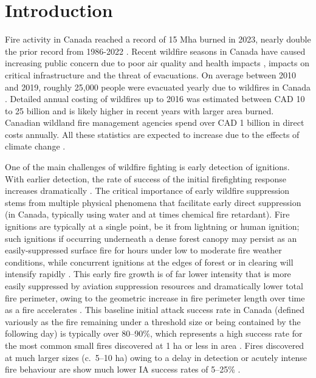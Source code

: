 \documentclass[fire,article,submit,moreauthors]{mdpi}
\begin{document}

\section{Introduction}\label{introduction}

Fire activity in Canada reached a record of 15 Mha burned in 2023,
nearly double the prior record from 1986-2022 \citep{hanes2025}. Recent
wildfire seasons in Canada have caused increasing public concern due to
poor air quality and health impacts
\citep{hertelendySeasonsSmokeFire2024, michaudLetterCanadaGlobal2024},
impacts on critical infrastructure and the threat of evacuations. On
average between 2010 and 2019, roughly 25,000 people were evacuated
yearly due to wildfires in Canada
\citep{christiansonWildlandFireEvacuations2024}. Detailed annual costing
of wildfires up to 2016 was estimated between CAD 10 to 25 billion
\citep{hopeWildfireSuppressionCosts2016} and is likely higher in recent
years with larger area burned. Canadian wildland fire management
agencies spend over CAD 1 billion in direct costs
annually\citep{stocksForestFireManagement2016, hopeWildfireSuppressionCosts2016}.
All these statistics are expected to increase due to the effects of
climate change
\citep{wangIncreasingFrequencyExtreme2015, hopeWildfireSuppressionCosts2016}.

One of the main challenges of wildfire fighting is early detection of
ignitions. With earlier detection, the rate of success of the initial
firefighting response increases dramatically
\citep{korkolaComparativeAnalysisWildfire2024, hirschReviewInitialAttack1996, hirschUsingExpertJudgment1998}.
The critical importance of early wildfire suppression stems from
multiple physical phenomena that facilitate early direct suppression (in
Canada, typically using water and at times chemical fire retardant).
Fire ignitions are typically at a single point, be it from lightning or
human ignition; such ignitions if occurring underneath a dense forest
canopy may persist as an easily-suppressed surface fire for hours under
low to moderate fire weather conditions, while concurrent ignitions at
the edges of forest or in clearing will intensify rapidly
\citep{mcraeInfluenceIgnitionType2017}. This early fire growth is of far
lower intensity that is more easily suppressed by aviation suppression
resources
\citep{wheatleyModellingInitialAttack2022, mcfaydenReferenceGuideDrop2023}
and dramatically lower total fire perimeter, owing to the geometric
increase in fire perimeter length over time as a fire accelerates
\citep{mcalpineAccelerationFirePoint1991}. This baseline initial attack
success rate in Canada (defined variously as the fire remaining under a
threshold size or being contained by the following day) is typically
over 80--90\%, which represents a high success rate for the most common
small fires discovered at 1 ha or less in area
\citep{wheatleyModellingInitialAttack2022}. Fires discovered at much
larger sizes (c.~5--10 ha) owing to a delay in detection or acutely
intense fire behaviour are show much lower IA success rates of 5--25\%
\citep{wheatleyModellingInitialAttack2022}.
\end{document}
